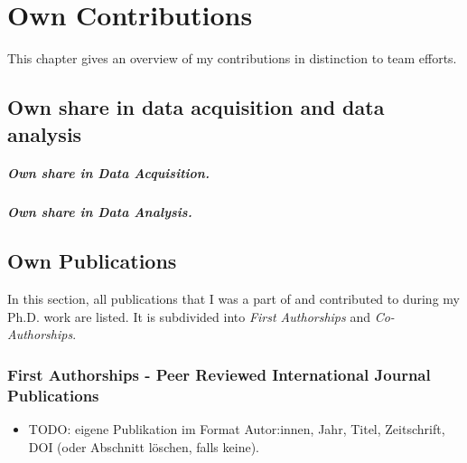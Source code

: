 \chapter*{Own Contributions}
\label{chap:contributions}

This chapter gives an overview of my contributions in distinction to team efforts.


\section*{Own share in data acquisition and data analysis}
{}
\label{sec:own-data-acquisition}

    
\lipsum[1]

\paragraph{Own share in Data Acquisition.}
\lipsum[1]  

\paragraph{Own share in Data Analysis.}
\lipsum[1] 
        
        

\section*{Own Publications}
\label{sec:own-publications}

In this section, all publications that I was a part of and contributed to during my Ph.D. work are listed. It is subdivided into \textit{First Authorships} and \textit{Co-Authorships}.
\hfill \break

\subsection*{First Authorships - Peer Reviewed International Journal Publications} \label{sec:publications:peer_reviewed_journal_first}

\begin{itemize}
    \item[] TODO: eigene Publikation im Format Autor:innen, Jahr, Titel, Zeitschrift, DOI (oder Abschnitt löschen, falls keine).
\end{itemize}

